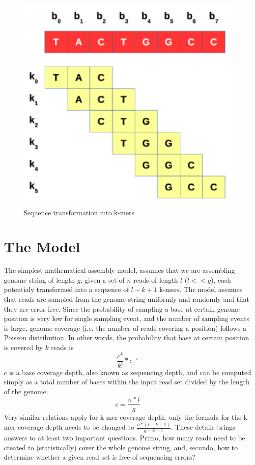 \begin{figure}[h]
	\centering
	\includegraphics{img/seq-division.pdf}
	\caption{Sequence transformation into k-mers}
	\label{fig:seq-division}
\end{figure}

\section{The Model}
\label{sec:the-model}

The simplest mathematical assembly model, assumes that we are assembling genome string of length $g$, given a set of $n$ reads of length $l$ ($l << g$), each potentialy transformed into a sequence of $l-k+1$ k-mers. The model assumes that reads are sampled from the genome string uniformly and randomly and that they are error-free. Since the probability of sampling a base at certain genome position is very low for single sampling event, and the number of sampling events is large, genome coverage (i.e. the number of reads covering a position) follows a Poisson distribution. In other words, the probability that base at certain position is covered by $k$ reads is
$$
\frac{c^k}{k!}*e^{-c}
$$
$c$ is a base coverage depth, also known as sequencing depth, and can be computed simply as a total number of bases within the input read set divided by the length of the genome.
$$
c = \frac{n * l}{g}
$$
Very similar relations apply for k-mer coverage depth, only the formula for the k-mer coverage depth needs to be changed to $\frac{n*(l - k + 1)}{g - k + 1}$. These details brings answers to at least two important questions. Primo, how many reads need to be created to (statistically) cover the whole genome string, and, secundo, how to determine whether a given read set is free of sequencing errors?

